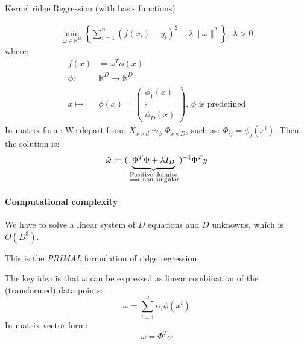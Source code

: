 \pagebreak
\begin{example}[breakable]{Kernel ridge Regression (with basis functions)}{}

	\begin{align*}
		\min_{\omega \in \mathds R^D} \left\{
		\sum_{i=1}^n (f(x_i) - y_i)^2 + \lambda \lVert \omega \rVert^2
		\right\},\, \lambda > 0
	\end{align*}
	where:
	\begin{align*}
		f(x)      & = \omega^T \phi(x)                                    \\
		\phi :    & \mathds R^D \to \mathds R^D                           \\
		x \mapsto & \phi(x) = \begin{pmatrix}
			                      \phi_1(x) \\
			                      \vdots    \\
			                      \phi_D(x)
		                      \end{pmatrix},\, \phi \text{ is predefined}
	\end{align*}
	\tcbline
	In matrix form: We depart from:
	$X_{x\times d} \leadsto_{\phi} \Phi_{x\times D}$,
	such as: $\Phi_{ij} = \phi_j(x^i)$. Then
	the solution is:
	\begin{equation*}
		\hat \omega \coloneqq
		(\underbrace{\vphantom{\bigr|}\Phi^T \Phi + \lambda I_D}_{\substack{\text{Positive definite}
				\\ \implies \text{non-singular}}})^{-1} \Phi^T y
	\end{equation*}

	\paragraph{Computational complexity}
	We have to solve a linear system of $D$ equations and $D$ unknowns,
	which is $O(D^3)$.

	\begin{note}
		This is the \emph{PRIMAL} formulation of ridge regression.
	\end{note}


	\begin{note}
		The key idea is that $\omega$ can be expressed as linear combination of
		the (transformed) data points:
		\begin{equation*}
			\omega = \sum_{i=1}^n \alpha_i \phi(x^i)
		\end{equation*}
		In matrix vector form:
		\begin{equation*}
			\omega = \Phi^T \alpha
		\end{equation*}
	\end{note}


\end{example}
